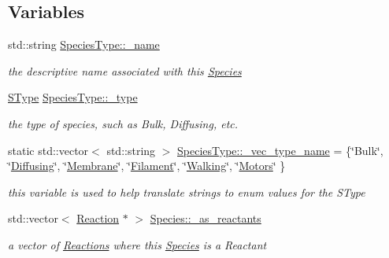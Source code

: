 \subsection*{Variables}
\begin{DoxyCompactItemize}
\item 
std\-::string \hyperlink{group__Chemistry_gac062140ac4d8e0b7d2e0b8e934a9cb9d}{Species\-Type\-::\-\_\-name}
\begin{DoxyCompactList}\small\item\em the descriptive name associated with this \hyperlink{classSpecies}{Species} \end{DoxyCompactList}\item 
\hyperlink{group__Chemistry_ga49104ff0a7d4118feb179c2f1c906f12}{S\-Type} \hyperlink{group__Chemistry_ga5acc1777425b096830e64a4e5080afbc}{Species\-Type\-::\-\_\-type}
\begin{DoxyCompactList}\small\item\em the type of species, such as Bulk, Diffusing, etc. \end{DoxyCompactList}\item 
static std\-::vector$<$ std\-::string $>$ \hyperlink{group__Chemistry_ga8a4ff9d2899dab92d059bd59b9b5bf13}{Species\-Type\-::\-\_\-vec\-\_\-type\-\_\-name} = \{\char`\"{}Bulk\char`\"{}, \char`\"{}\hyperlink{group__Chemistry_gga49104ff0a7d4118feb179c2f1c906f12a6fd38f35f0769a1078f3985c73141f32}{Diffusing}\char`\"{}, \char`\"{}\hyperlink{group__Chemistry_gga49104ff0a7d4118feb179c2f1c906f12abfefb8fd60296e6af745b2c55a00d3e7}{Membrane}\char`\"{}, \char`\"{}\hyperlink{group__Chemistry_gga49104ff0a7d4118feb179c2f1c906f12a1b756abdd29940ec0263e68c81a47bad}{Filament}\char`\"{}, \char`\"{}\hyperlink{group__Chemistry_gga49104ff0a7d4118feb179c2f1c906f12a7632ff25e7a1c2e6df8c2003b738fe72}{Walking}\char`\"{}, \char`\"{}\hyperlink{group__Chemistry_gga49104ff0a7d4118feb179c2f1c906f12a264a8b043a2ec5b11bc7ee5962486742}{Motors}\char`\"{} \}
\begin{DoxyCompactList}\small\item\em this variable is used to help translate strings to enum values for the S\-Type \end{DoxyCompactList}\item 
std\-::vector$<$ \hyperlink{classReaction}{Reaction} $\ast$ $>$ \hyperlink{group__Chemistry_gaa994e09514c87bde421fd6af1ccc54c0}{Species\-::\-\_\-as\-\_\-reactants}
\begin{DoxyCompactList}\small\item\em a vector of \hyperlink{classReaction}{Reactions} where this \hyperlink{classSpecies}{Species} is a Reactant \end{DoxyCompactList}\item 

\end{DoxyCompactItemize}
